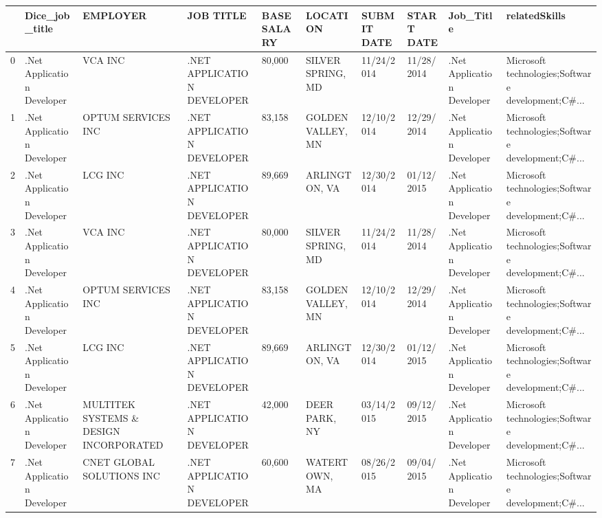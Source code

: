 \begin{table}[h!]
{\begin{tabular}{llllllllll}
	\hline
	{} &              Dice\_job\_title &                                           EMPLOYER &                   JOB TITLE & BASE SALARY &            LOCATION & SUBMIT DATE &  START DATE &                   Job\_Title &                                      relatedSkills \\
	\hline
	0  &  .Net Application Developer &                                            VCA INC &  .NET APPLICATION DEVELOPER &      80,000 &   SILVER SPRING, MD &  11/24/2014 &  11/28/2014 &  .Net Application Developer &  Microsoft technologies;Software development;C\#... \\
	1  &  .Net Application Developer &                                 OPTUM SERVICES INC &  .NET APPLICATION DEVELOPER &      83,158 &   GOLDEN VALLEY, MN &  12/10/2014 &  12/29/2014 &  .Net Application Developer &  Microsoft technologies;Software development;C\#... \\
	2  &  .Net Application Developer &                                            LCG INC &  .NET APPLICATION DEVELOPER &      89,669 &       ARLINGTON, VA &  12/30/2014 &  01/12/2015 &  .Net Application Developer &  Microsoft technologies;Software development;C\#... \\
	3  &  .Net Application Developer &                                            VCA INC &  .NET APPLICATION DEVELOPER &      80,000 &   SILVER SPRING, MD &  11/24/2014 &  11/28/2014 &  .Net Application Developer &  Microsoft technologies;Software development;C\#... \\
	4  &  .Net Application Developer &                                 OPTUM SERVICES INC &  .NET APPLICATION DEVELOPER &      83,158 &   GOLDEN VALLEY, MN &  12/10/2014 &  12/29/2014 &  .Net Application Developer &  Microsoft technologies;Software development;C\#... \\
	5  &  .Net Application Developer &                                            LCG INC &  .NET APPLICATION DEVELOPER &      89,669 &       ARLINGTON, VA &  12/30/2014 &  01/12/2015 &  .Net Application Developer &  Microsoft technologies;Software development;C\#... \\
	6  &  .Net Application Developer &             MULTITEK SYSTEMS \& DESIGN INCORPORATED &  .NET APPLICATION DEVELOPER &      42,000 &       DEER PARK, NY &  03/14/2015 &  09/12/2015 &  .Net Application Developer &  Microsoft technologies;Software development;C\#... \\
	7  &  .Net Application Developer &                          CNET GLOBAL SOLUTIONS INC &  .NET APPLICATION DEVELOPER &      60,600 &       WATERTOWN, MA &  08/26/2015 &  09/04/2015 &  .Net Application Developer &  Microsoft technologies;Software development;C\#... \\

\end{tabular}}
\end{table}

